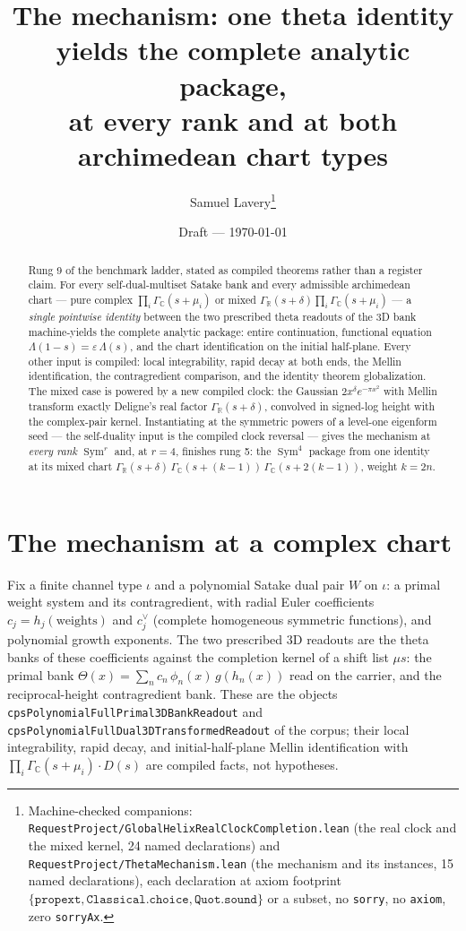 \documentclass[11pt]{article}
\title{The mechanism: one theta identity yields the complete analytic package,\\
at every rank and at both archimedean chart types}
\author{Samuel Lavery\thanks{Machine-checked companions:
\texttt{RequestProject/GlobalHelixRealClockCompletion.lean} (the real clock and the mixed
kernel, 24 named declarations) and \texttt{RequestProject/ThetaMechanism.lean} (the
mechanism and its instances, 15 named declarations), each declaration at axiom footprint
$\{\texttt{propext},\texttt{Classical.choice},\texttt{Quot.sound}\}$ or a subset,
no \texttt{sorry}, no \texttt{axiom}, zero \texttt{sorryAx}.}}
\date{Draft --- \today}
\newcommand{\Sym}{\operatorname{Sym}}
\newcommand{\Gm}{\Gamma_{\mathbb C}}
\newcommand{\Gr}{\Gamma_{\mathbb R}}
\begin{document}
\maketitle

\begin{abstract}
Rung 9 of the benchmark ladder, stated as compiled theorems rather than a register
claim.  For every self-dual-multiset Satake bank and every admissible archimedean chart
--- pure complex $\prod_i\Gm(s+\mu_i)$ or mixed $\Gr(s+\delta)\prod_i\Gm(s+\mu_i)$ ---
a \emph{single pointwise identity} between the two prescribed theta readouts of the 3D
bank machine-yields the complete analytic package: entire continuation, functional
equation $\Lambda(1-s)=\varepsilon\,\Lambda(s)$, and the chart identification on the
initial half-plane.  Every other input is compiled: local integrability, rapid decay at
both ends, the Mellin identification, the contragredient comparison, and the identity
theorem globalization.  The mixed case is powered by a new compiled clock: the Gaussian
$2x^{\delta}e^{-\pi x^2}$ with Mellin transform exactly Deligne's real factor
$\Gr(s+\delta)$, convolved in signed-log height with the complex-pair kernel.
Instantiating at the symmetric powers of a level-one eigenform seed --- the self-duality
input is the compiled clock reversal --- gives the mechanism at \emph{every rank}
$\Sym^r$ and, at $r=4$, finishes rung 5: the $\Sym^4$ package from one identity at its
mixed chart $\Gr(s+\delta)\,\Gm(s+(k-1))\,\Gm(s+2(k-1))$, weight $k=2n$.
\end{abstract}

\section{The mechanism at a complex chart}

Fix a finite channel type $\iota$ and a polynomial Satake dual pair $W$ on $\iota$: a
primal weight system and its contragredient, with radial Euler coefficients
$c_j=h_j(\text{weights})$ and $c^\vee_j$ (complete homogeneous symmetric functions), and
polynomial growth exponents.  The two prescribed 3D readouts are the theta banks of
these coefficients against the completion kernel of a shift list $\mu s$: the primal
bank $\Theta(x)=\sum_n c_{n}\,\phi_{n}(x)\,g(h_n(x))$ read on the carrier, and the
reciprocal-height contragredient bank.  These are the objects
\texttt{cpsPolynomialFullPrimal3DBankReadout} and
\texttt{cpsPolynomialFullDual3DTransformedReadout} of the corpus; their local
integrability, rapid decay, and initial-half-plane Mellin identification with
$\prod_i\Gm(s+\mu_i)\cdot D(s)$ are compiled facts, not hypotheses.
\end{document}
